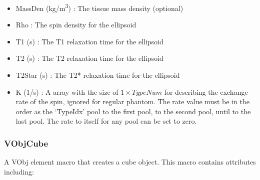 \documentclass{book}%
\begin{document}
\begin{itemize}
\begin{itemize}
		\item MassDen (kg/m\textsuperscript{3}) : The tissue mass density (optional)
		\item Rho : The spin density for the ellipsoid
		\item T1 (s) : The T1 relaxation time for the ellipsoid
		\item T2 (s) : The T2 relaxation time for the ellipsoid
		\item T2Star (s) : The T2* relaxation time for the ellipsoid
		\item K (1/s) : A array with the size of $1 \times TypeNum$ for describing the exchange rate of the spin, ignored for regular phantom. The rate value must be in the order as the `TypeIdx' pool to the first pool, to the second pool, until to the last pool. The rate to itself for any pool can be set to zero.
	\end{itemize}
\end{itemize}


\subsubsection{VObjCube}

A VObj element macro that creates a cube object. This macro contains attributes including:
\end{document}
